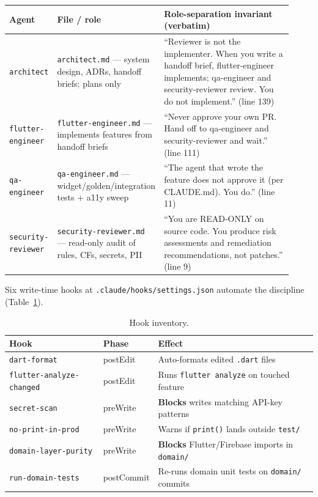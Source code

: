 \documentclass[11pt,a4paper]{article}
\begin{document}
{\small
\renewcommand{\arraystretch}{1.25}
\begin{longtable}{@{}p{0.16\linewidth} p{0.30\linewidth} p{0.46\linewidth}@{}}
\toprule
\textbf{Agent} & \textbf{File / role} & \textbf{Role-separation invariant (verbatim)} \\
\midrule
\endhead
\texttt{architect}        & \texttt{architect.md} --- system design, ADRs, handoff briefs; plans only & ``Reviewer is not the implementer. When you write a handoff brief, flutter-engineer implements; qa-engineer and security-reviewer review. You do not implement.'' (line 139) \\
\texttt{flutter-engineer} & \texttt{flutter-engineer.md} --- implements features from handoff briefs & ``Never approve your own PR. Hand off to qa-engineer and security-reviewer and wait.'' (line 111) \\
\texttt{qa-engineer}      & \texttt{qa-engineer.md} --- widget/golden/integration tests + a11y sweep & ``The agent that wrote the feature does not approve it (per CLAUDE.md). You do.'' (line 11) \\
\texttt{security-reviewer}& \texttt{security-reviewer.md} --- read-only audit of rules, CFs, secrets, PII & ``You are READ-ONLY on source code. You produce risk assessments and remediation recommendations, not patches.'' (line 9) \\
\bottomrule
\end{longtable}
}

Six write-time hooks at \texttt{.claude/hooks/settings.json} automate
the discipline (Table~\ref{tab:hooks}).

\begin{table}[h]
\caption{Hook inventory.}\label{tab:hooks}
\small
\begin{tabular}{@{}lll@{}}
\toprule
\textbf{Hook} & \textbf{Phase} & \textbf{Effect} \\
\midrule
\texttt{dart-format}            & postEdit   & Auto-formats edited \texttt{.dart} files \\
\texttt{flutter-analyze-changed}& postEdit   & Runs \texttt{flutter analyze} on touched feature \\
\texttt{secret-scan}            & preWrite   & \textbf{Blocks} writes matching API-key patterns \\
\texttt{no-print-in-prod}       & preWrite   & Warns if \texttt{print()} lands outside \texttt{test/} \\
\texttt{domain-layer-purity}    & preWrite   & \textbf{Blocks} Flutter/Firebase imports in \texttt{domain/} \\
\texttt{run-domain-tests}       & postCommit & Re-runs domain unit tests on \texttt{domain/} commits \\
\bottomrule
\end{tabular}
\end{table}
\end{document}
